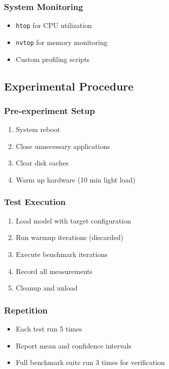 \subsubsection{System Monitoring}

\begin{itemize}
    \item \texttt{htop} for CPU utilization
    \item \texttt{nvtop} for memory monitoring
    \item Custom profiling scripts
\end{itemize}

\subsection{Experimental Procedure}

\subsubsection{Pre-experiment Setup}

\begin{enumerate}
    \item System reboot
    \item Close unnecessary applications
    \item Clear disk caches
    \item Warm up hardware (10 min light load)
\end{enumerate}

\subsubsection{Test Execution}

\begin{enumerate}
    \item Load model with target configuration
    \item Run warmup iterations (discarded)
    \item Execute benchmark iterations
    \item Record all measurements
    \item Cleanup and unload
\end{enumerate}

\subsubsection{Repetition}

\begin{itemize}
    \item Each test run 5 times
    \item Report mean and confidence intervals
    \item Full benchmark suite run 3 times for verification
\end{itemize}

